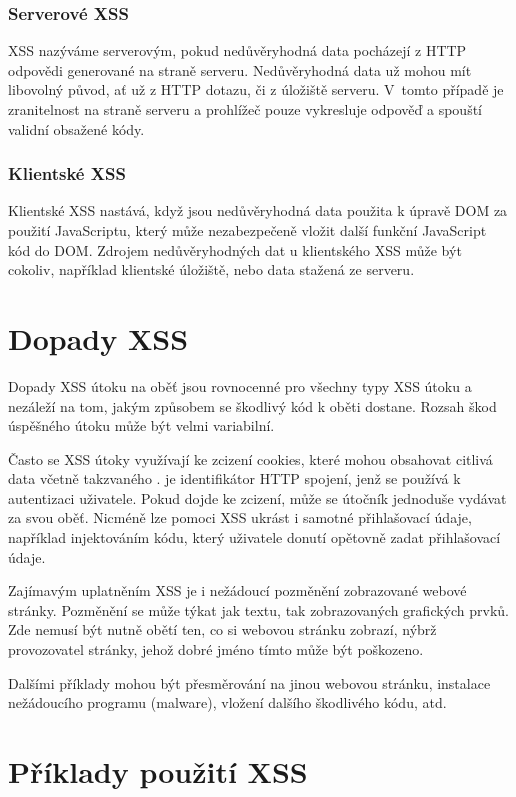 \documentclass[11pt,conference, a4paper]{IEEEtran}
\begin{document}
\subsubsection{Serverové XSS}
XSS nazýváme serverovým, pokud nedůvěryhodná data pocházejí z HTTP odpovědi generované na straně serveru. Nedůvěryhodná data už mohou mít libovolný původ, ať už z HTTP dotazu, či z úložiště serveru. V~tomto případě je zranitelnost na straně serveru a prohlížeč pouze vykresluje odpověď a spouští validní obsažené kódy.


\subsubsection{Klientské XSS}
Klientské XSS nastává, když jsou nedůvěryhodná data použita k úpravě DOM za použití JavaScriptu, který může nezabezpečeně vložit další funkční JavaScript kód do DOM. Zdrojem nedůvěryhodných dat u klientského XSS může být cokoliv, například klientské úložiště, nebo data stažená ze serveru.~\cite{TYPES-XSS-owasp}


\section{Dopady XSS}
Dopady XSS útoku na oběť jsou rovnocenné pro všechny typy XSS útoku a nezáleží na tom, jakým způsobem se škodlivý kód k oběti dostane. Rozsah škod úspěšného útoku může být velmi variabilní.

Často se XSS útoky využívají ke zcizení cookies, které mohou obsahovat citlivá data včetně takzvaného .  je identifikátor HTTP spojení, jenž se používá k autentizaci uživatele. Pokud dojde ke zcizení, může se útočník jednoduše vydávat za svou oběť. Nicméně lze pomoci XSS ukrást i samotné přihlašovací údaje, například injektováním kódu, který uživatele donutí opětovně zadat přihlašovací údaje. 

Zajímavým uplatněním XSS je i nežádoucí pozměnění zobrazované webové stránky. Pozměnění se může týkat jak textu, tak zobrazovaných grafických prvků. Zde nemusí být nutně obětí ten, co si webovou stránku zobrazí, nýbrž provozovatel stránky, jehož dobré jméno tímto může být poškozeno. 

Dalšími příklady mohou být přesměrování na jinou webovou stránku, instalace nežádoucího programu \mbox{(malware)}, vložení dalšího škodlivého kódu, atd.


\section{Příklady použití XSS}
\end{document}
